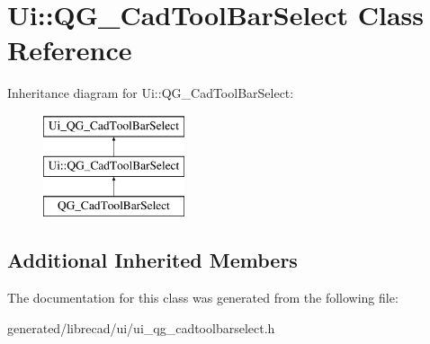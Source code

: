 \hypertarget{classUi_1_1QG__CadToolBarSelect}{\section{Ui\-:\-:Q\-G\-\_\-\-Cad\-Tool\-Bar\-Select Class Reference}
\label{classUi_1_1QG__CadToolBarSelect}
}
Inheritance diagram for Ui\-:\-:Q\-G\-\_\-\-Cad\-Tool\-Bar\-Select\-:\begin{figure}[H]
\begin{center}
\leavevmode
\includegraphics[height=3.000000cm]{classUi_1_1QG__CadToolBarSelect}
\end{center}
\end{figure}
\subsection*{Additional Inherited Members}


The documentation for this class was generated from the following file\-:\begin{DoxyCompactItemize}
\item 
generated/librecad/ui/ui\-\_\-qg\-\_\-cadtoolbarselect.\-h\end{DoxyCompactItemize}
